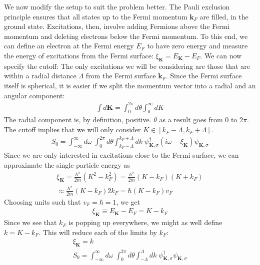 \documentclass[12pt]{article}
\begin{document}
\begin{minipage}{0.55\textwidth}
We now modify the setup to suit the problem better. The Pauli exclusion principle ensures that all states up to the Fermi momentum \(\mathbf{k}_F\) are filled, in the ground state. Excitations, then, involve adding Fermions above the Fermi momentum and deleting electrons below the Fermi momentum. To this end, we can define an electron at the Fermi energy \(E_F\) to have zero energy and measure the energy of excitations from the Fermi surface: \(\xi_{\mathbf K} = E_{\mathbf K} - E_F\).
We can now specify the cutoff: The only excitations we will be considering are those that are within a radial distance \(\Lambda\) from the Fermi surface \(\mathbf{k}_F\). Since the Fermi surface itself is spherical, it is easier if we split the momentum vector into a radial and an angular component:
\begin{equation}\begin{aligned}
\int d\mathbf{K} = \int_0^{2\pi} d\theta \int_0^\infty dK
\end{aligned}\end{equation}
The radial component is, by definition, positive. \(\theta\) as a result goes from \(0\) to \(2\pi\). The cutoff implies that we will only consider \(K \in \left[k_F - \Lambda, k_F + \Lambda\right]\).
\begin{equation}\begin{aligned}
	S_0 = \int_{-\infty}^\infty d\omega\;\int_0^{2\pi} d\theta \int_{k_F - \Lambda}^{k_F + \Lambda}  dk\; \psi_{\mathbf{K},\sigma}^\dagger \left(i\omega - \xi_{\mathbf{K}}\right)\psi_{\mathbf{K},\sigma}
\end{aligned}\end{equation}
Since we are only interested in excitations close to the Fermi surface, we can approximate the single particle energy as
\begin{equation}\begin{aligned}
	\xi_\mathbf{K} = \frac{\hbar^2}{2m}\left(K^2 - k_F^2\right) = \frac{\hbar^2}{2m}\left(K - k_F\right)\left(K + k_F\right) \\
	\approx \frac{\hbar^2}{2m}\left(K - k_F\right)2k_F = \hbar \left(K-k_F\right)v_F
\end{aligned}\end{equation}
Choosing units such that \(v_F = \hbar = 1\), we get
\begin{equation}\begin{aligned}
	\xi_\mathbf{K} \equiv E_\mathbf{K} - E_F = K - k_F
\end{aligned}\end{equation}
Since we see that \(k_F\) is popping up everywhere, we might as well define \(k = K - k_F\). This will reduce each of the limits by \(k_F\):
\begin{gather}
	\xi_\mathbf{K} = k \\
	S_0 = \int_{-\infty}^\infty d\omega\;\int_0^{2\pi} d\theta \int_{- \Lambda}^{\Lambda}  dk\; \psi_{\mathbf{K},\sigma}^\dagger \psi_{\mathbf{K},\sigma}\label{action}
\end{gather}
\end{minipage}
\end{document}
